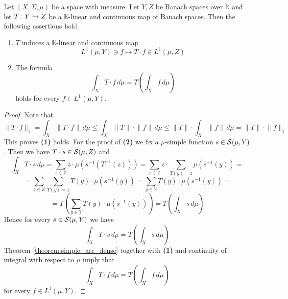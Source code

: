 \begin{proposition}\label{proposition:Bochner_integral_commutes_with_any_continuous_linear_operation}
    Let $(X,\Sigma,\mu)$ be a space with measure. Let $Y, Z$ be Banach spaces over $\mathbb{K}$ and let $T:Y \rightarrow Z$ be a $\mathbb{K}$-linear and continuous map of Banach spaces. Then the following assertions hold.
    \begin{enumerate}[label=\emph{\textbf{(\arabic*)}}, leftmargin=*]
        \item $T$ induces a $\mathbb{K}$-linear and continuous map 
        $$L^1(\mu,Y) \ni f \mapsto T\cdot f \in L^1(\mu,Z)$$
        \item The formula 
        $$\int_X T\cdot f \,d\mu = T\left(\int_X f\,d\mu\right)$$
        holds for every $f \in L^1(\mu,Y)$.
    \end{enumerate}
\end{proposition}
\begin{proof}
    Note that
    $$\lVert T\cdot f \rVert_1 = \int_X\lVert T\cdot f \rVert\,d\mu \leq \int_X \lVert T\rVert\cdot \lVert f \rVert\,d\mu \leq \lVert T\rVert\cdot \int_X  \lVert f \rVert\,d\mu = \lVert T\rVert\cdot \lVert f \rVert_1$$
    This proves \textbf{(1)} holds. For the proof of \textbf{(2)} we fix a $\mu$-simple function $s \in {\mathcal S}(\mu,Y)$. Then we have $T\cdot s \in {\mathcal S}(\mu,Z)$ and
    $$\int_X T\cdot s\,d\mu = \sum_{z \in Z}z \cdot \mu\left(s^{-1}\left(T^{-1}(z)\right)\right) = \sum_{z\in Z}z\cdot \sum_{T(y) = z}\mu\left(s^{-1}(y)\right) = $$
    $$= \sum_{z \in Z}\sum_{T(y) = z}T(y)\cdot \mu\left(s^{-1}(y)\right) = \sum_{y\in Y} T(y)\cdot \mu\left(s^{-1}(y)\right) = $$
    $$=T\left( \sum_{y\in Y} T(y)\cdot \mu\left(s^{-1}(y)\right) \right) = T\left( \int_X s\,d\mu\right)$$
    Hence for every $s \in {\mathcal S}(\mu,Y)$ we have 
    $$\int_X T\cdot s \,d\mu = T\left(\int_X s\,d\mu\right)$$
    Theorem \ref{theorem:simple_are_dense} together with \textbf{(1)} and continuity of integral with respect to $\mu$ imply that
    $$\int_X T\cdot f \,d\mu = T\left(\int_X f\,d\mu\right)$$
    for every $f \in L^1(\mu,Y)$.
\end{proof}

